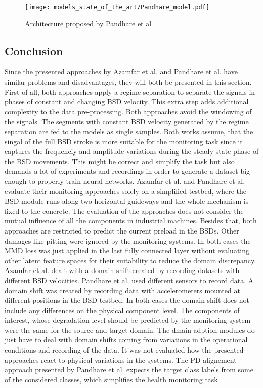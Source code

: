 \begin{figure}[H]
  \centering
  \texttt{[image: models\_state\_of\_the\_art/Pandhare\_model.pdf]}
  \caption{Architecture proposed by Pandhare et al \cite{Pandhare2021}}
  \label{fig:Pandhare_model}
\end{figure}

\subsection{Conclusion}
Since the presented approaches by Azamfar et al. \cite{AZAMFAR2020103932} and Pandhare et al. \cite{Pandhare2021} have similar problems and disadvantages, they will both be presented in this section. First of all, both approaches apply a regime separation to separate the signals in phases of constant and changing BSD velocity. This extra step adds additional complexity to the data pre-processing. Both approaches avoid the windowing of the signals. The segments with constant BSD velocity generated by the regime separation are fed to the models as single samples. Both works assume, that the singal of the full BSD stroke is more suitable for the monitoring task since it captures the frequenciy and amplitude variations during the steady-state phase of the BSD movements. This might be correct and simplify the task but also demands a lot of experiments and recordings in order to generate a dataset big enough to properly train neural networks. Azamfar et al. and  Pandhare et al. evaluate their monitoring approaches solely on a simplified testbed, where the BSD module runs along two horizontal guideways and the whole mechanism is fixed to the concrete. The evaluation of the approaches does not consider the mutual influence of all the components in industrial machines. Besides that, both approaches are restricted to predict the current preload in the BSDs. Other damages like pitting were ignored by the monitoring systems. In both cases the MMD loss was just applied in the last fully connected layer without evaluating other latent feature spaces for their suitability to reduce the domain discrepancy. Azamfar et al. dealt with a domain shift created by recording datasets with different BSD velocities. Pandhare et al. used different sensors to record data. A domain shift was created by recording data with accelerometers mounted at different positions in the BSD testbed. In both cases the domain shift does not include any differences on the physical component level. The components of interest, whose degradation level should be predicted by the monitoring system were the same for the source and target domain. The dmain adption modules do just have to deal with domain shifts coming from variations in the operational conditions and recording of the data. It was not evaluated how the presented approaches react to physical variations in the systems. The PD-alignement approach presented by Pandhare et al. expects the target class labels from some of the considered classes, which simplifies the health monitoring task


